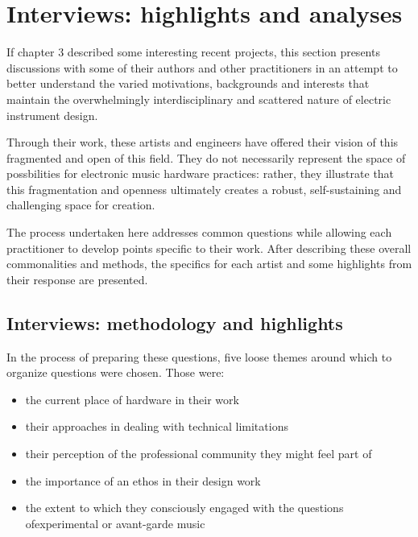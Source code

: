 \chapter{Interviews: highlights and analyses}\label{interviews}

If chapter 3 described some interesting recent projects, this section presents discussions with some of their authors and other practitioners in an attempt to better understand the varied motivations, backgrounds and interests that maintain the overwhelmingly interdisciplinary and scattered nature of electric instrument design. 

Through their work, these artists and engineers have offered their vision of this fragmented and open of this field. They do not necessarily represent the space of possbilities for electronic music hardware practices: rather, they illustrate that this fragmentation and openness ultimately creates a robust, self-sustaining and challenging space for creation. 

The process undertaken here addresses common questions while allowing each practitioner to develop points specific to their work. After describing these overall commonalities and methods, the specifics for each artist and some highlights from their response are presented. 

\section{Interviews: methodology and highlights}

In the process of preparing these questions, five loose themes around which to organize questions were chosen. Those were: 

\begin{itemize}
	\item the current place of hardware in their work 
	\item their approaches in dealing with technical limitations
	\item their perception of the professional community they might feel part of
	\item the importance of an ethos in their design work
	\item the extent to which they consciously engaged with the questions ofexperimental or avant-garde music 
	\end{itemize}

